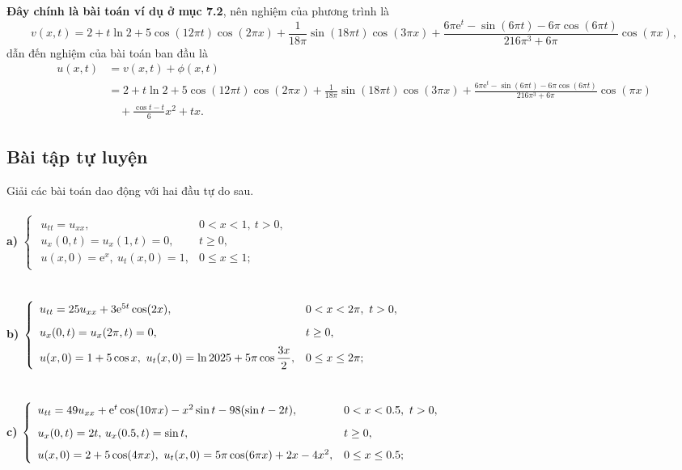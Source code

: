 \documentclass[10pt, a4paper]{article}
\begin{document}
	\textbf{Đây chính là bài toán ví dụ ở mục 7.2}, nên nghiệm của phương trình là $$v(x,t)=2+t\ln2+5\cos(12\pi t)\cos(2\pi x)+\frac{1}{18\pi}\sin(18\pi t)\cos(3\pi x)+\frac{6\pi\mathrm e^t-\sin(6\pi t)-6\pi\cos(6\pi t)}{216\pi^3+6\pi}\cos(\pi x),$$
	dẫn đến nghiệm của bài toán ban đầu là \begin{align*}
		u(x,t)&=v(x,t)+\phi(x,t)\\
		&=2+t\ln2+5\cos(12\pi t)\cos(2\pi x)+\frac{1}{18\pi}\sin(18\pi t)\cos(3\pi x)+\frac{6\pi\mathrm e^t-\sin(6\pi t)-6\pi\cos(6\pi t)}{216\pi^3+6\pi}\cos(\pi x)\\
		&\,\,\,\,\,\,+\frac{\cos t-t}{6}x^2+tx.
	\end{align*}
	\subsection{Bài tập tự luyện}
	Giải các bài toán dao động với hai đầu tự do sau.\\\\
	\textbf{a) }$\begin{cases}
		\begin{array}{ll}
			u_{tt}=u_{xx}, & 0<x<1,~t>0, \\
			u_x(0,t)=u_x(1,t)=0, & t\ge0, \\
			u(x,0)=\mathrm e^x,~u_t(x,0)=1, & 0\le x\le1;
		\end{array}
	\end{cases}$\\\\\\
	\textbf{b) }$\begin{cases}
		\begin{array}{ll}
			u_{tt}=25u_{xx}+3\mathrm e^{5t}\cos(2x), & 0<x<2\pi,~t>0, \\
			\noalign{\vskip6pt}
			u_x(0,t)=u_x(2\pi,t)=0, & t\ge0, \\
			\noalign{\vskip5pt}
			u(x,0)=1+5\cos x,~u_t(x,0)=\ln2025+5\pi\cos\dfrac{3x}{2}, & 0\le x\le2\pi;
		\end{array}
	\end{cases}$\\\\\\
	\textbf{c) }$\begin{cases}
		\begin{array}{ll}
			u_{tt}=49u_{xx}+\mathrm e^{t}\cos(10\pi x)-x^2\sin t-98(\sin t-2t), & 0<x<0.5,~t>0, \\
			\noalign{\vskip6pt}
			u_x(0,t)=2t,\,u_x(0.5,t)=\sin t, & t\ge0, \\
			\noalign{\vskip5pt}
			u(x,0)=2+5\cos(4\pi x),~u_t(x,0)=5\pi\cos(6\pi x)+2x-4x^2, & 0\le x\le0.5;
		\end{array}
	\end{cases}$\\\\\\
\end{document}
